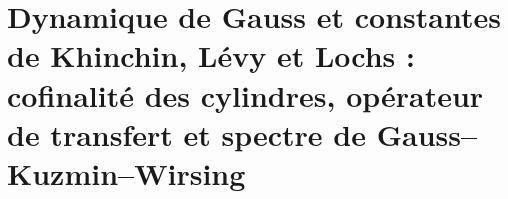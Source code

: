 \HMTFlushCurrentChapter
\chapter{Dynamique de Gauss et constantes de Khinchin, Lévy et Lochs : cofinalité des cylindres, opérateur de transfert et spectre de Gauss--Kuzmin--Wirsing}%
\begingroup
\renewcommand{\chapter}[2][]{}%
%
\endgroup

\begin{HMTScientificOwnerSubordinated}

\end{HMTScientificOwnerSubordinated}

\HMTFlushCurrentChapter
\chapter{Criticité unimodale de la famille dodécaphasique : profil analytique exact, approximants de Feigenbaum et certificat hyperbolique de renormalisation}%
\begingroup
\renewcommand{\chapter}[2][]{}%
%
\endgroup

\HMTFlushCurrentChapter
\chapter{Arithmétique de la famille modulaire dodécaphasique de période \(30\): identités de Rogers--Ramanujan, normalisateur \(899\) et relèvement nonadique de Pell}%
\begingroup
\renewcommand{\chapter}[2][]{}%
%
\endgroup
\begin{HMTSpiralChapterBody}

\end{HMTSpiralChapterBody}

